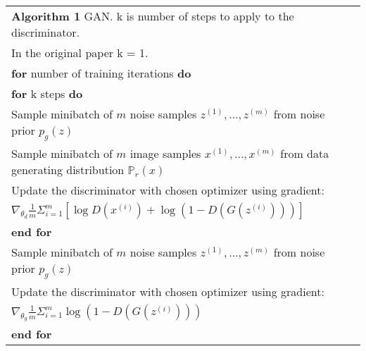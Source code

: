 \documentclass[10pt,twocolumn,letterpaper]{article}
\begin{document}
\begin{table*}[t]
  \centering
  \begin{tabular}{lcr}
   {\bf Algorithm 1} GAN. k is number of steps to apply to the discriminator. \\
   {\color{black} In the original paper k = 1.}\\ \hline
   {\bf for} number of training iterations {\bf do}\\
   \hspace{4mm} {\bf for} k steps {\bf do}\\
   \hspace{8mm} Sample minibatch of $m$ noise samples ${z^{(1)}, ..., z^{(m)}}$ from noise prior $p_g(z)$\\
   \hspace{8mm} Sample minibatch of $m$ image samples ${x^{(1)}, ..., x^{(m)}}$ from data generating distribution $\mathbb{P}_r(x)$\\
   \hspace{8mm} Update the discriminator with chosen optimizer using gradient: \\
   \hspace{16mm} $\nabla_{\theta_d} \frac{1}{m} \Sigma_{i=1}^m [\log D(x^{(i)}) + \log (1 - D(G(z^{(i)})))]$ \\
   \hspace{4mm} {\bf end for} \\
   \hspace{4mm} Sample minibatch of $m$ noise samples ${z^{(1)}, ..., z^{(m)}}$ from noise prior $p_g(z)$\\
   \hspace{4mm} Update the discriminator with chosen optimizer using gradient: \\
   \hspace{16mm} $\nabla_{\theta_g} \frac{1}{m} \Sigma_{i=1}^m \log (1 - D(G(z^{(i)})))$ \\   
   {\bf end for} \\ \hline
  \end{tabular}
  \label{algo_gan}
\end{table*}
\end{document}
